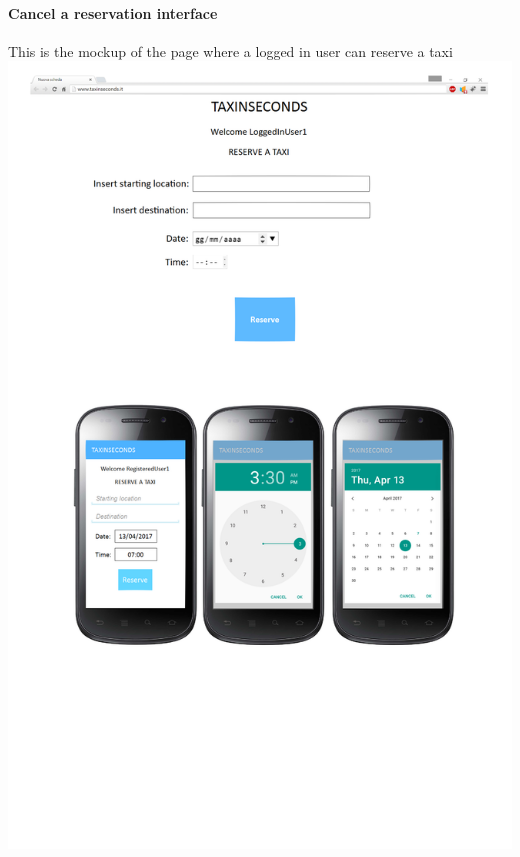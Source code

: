 \documentclass{article}
\begin{document}
\paragraph{Cancel a reservation interface}%
This is the mockup of the page where a logged in user can reserve a taxi
\includegraphics{Reserve a taxi}
\clearpage
\end{document}
